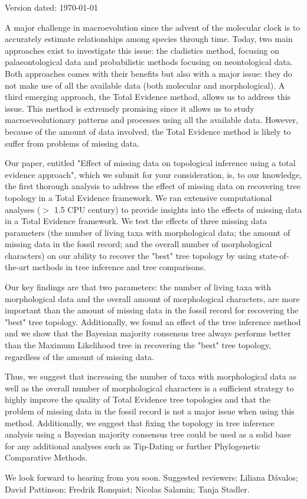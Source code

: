 \documentclass[a4paper,11pt]{article}
\begin{document}
\begin{flushright}
Version dated: \today
\end{flushright}


A major challenge in macroevolution since the advent of the molecular clock is to accurately estimate relationships among species through time. Today, two main approaches exist to investigate this issue: the cladistics method, focusing on palaeontological data and probabilistic methods focusing on neontological data. Both approaches comes with their benefits but also with a major issue: they do not make use of all the available data (both molecular and morphological). A third emerging approach, the Total Evidence method, allows us to address this issue. This method is extremely promising since it allows us to study macroeveolutionary patterns and processes using all the available data. However, because of the amount of data involved, the Total Evidence method is likely to suffer from problems of missing data.

Our paper, entitled "Effect of missing data on topological inference using a total evidence approach", which we submit for your consideration, is, to our knowledge, the first thorough analysis to address the effect of missing data on recovering tree topology in a Total Evidence framework. We ran extensive computational analyses ($>$ 1.5 CPU century) %
to provide insights into the effects of missing data in a Total Evidence framework. We test the effects of three missing data parameters (the number of living taxa with morphological data; the amount of missing data in the fossil record; and the overall number of morphological characters) on our ability to recover the "best" tree topology by using state-of-the-art methods in tree inference and tree comparisons.

Our key findings are that two parameters: the number of living taxa with morphological data and the overall amount of morphological characters, are more important than the amount of missing data in the fossil record for recovering the "best" tree topology. Additionally, we found an effect of the tree inference method and we show that the Bayesian majority consensus tree always performs better than the Maximum Likelihood tree in recovering the "best" tree topology, regardless of the amount of missing data.

Thus, we suggest that increasing the number of taxa with morphological data as well as the overall number of morphological characters is a sufficient strategy to highly improve the quality of Total Evidence tree topologies and that the problem of missing data in the fossil record is not a major issue when using this method. Additionally, we suggest that fixing the topology in tree inference analysis using a Bayesian majority consensus tree could be used as a solid base for any additional analyses such as Tip-Dating or further Phylogenetic Comparative Methods.

We look forward to hearing from you soon.
\newline
\newline
{}
\newline
\newline
{}
\newline
\newline
Suggested reviewers: Liliana D\'{a}valos; David Pattinson; Fredrik Ronquist; Nicolas Salamin; Tanja Stadler.
\end{document}
